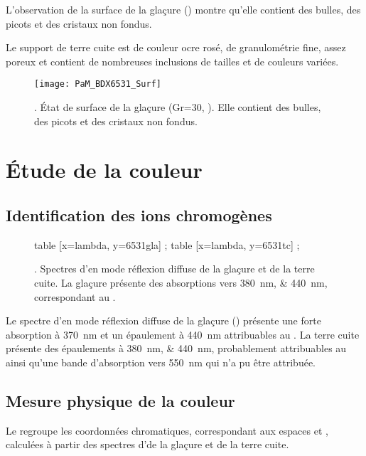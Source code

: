 L'observation de la surface de la glaçure () montre 
qu'elle contient des bulles, des picots et des cristaux non fondus.

Le support de terre cuite est de couleur ocre rosé, de granulométrie
fine, assez poreux et contient de nombreuses inclusions de tailles et
de couleurs variées.

\begin{figure}[htb]
  \texttt{[image: PaM\_BDX6531\_Surf]}
  \caption[\ -- État de surface de la glaçure]
          {\legendeD.
           État de surface de la glaçure 
           (Gr=30, ). Elle contient des bulles, 
           des picots et des cristaux non fondus.}
  \label{surf:6531}
\end{figure}


\section{Étude de la couleur}

\subsection{Identification des ions chromogènes}
\begin{figure}[htb]
  \begin{plotspectre}
       table [x=lambda, y=6531gla] {\gladata} ;
       table [x=lambda, y=6531tc] {\tcdata} ;
  \end{plotspectre}
  \caption{\legendeD.
           Spectres d'\AO en mode réflexion diffuse de la glaçure et 
           de la terre cuite. La glaçure présente des absorptions vers 
           \SIlist{380;440}{\nm}, correspondant au .}
  \label{spectre:6531}
\end{figure}

Le spectre d'\AO en mode réflexion diffuse de la glaçure 
() présente une forte absorption à \SI{370}{\nm} 
et un épaulement à \SI{440}{\nm} attribuables au . La terre 
cuite présente des épaulements à \SIlist{380;440}{\nm}, probablement 
attribuables au  ainsi qu'une bande d'absorption vers 
\SI{550}{\nm} qui n'a pu être attribuée.

\subsection{Mesure physique de la couleur}
Le  regroupe les coordonnées chromatiques, 
correspondant aux espaces \Yxy et \Lab, calculées à partir des 
spectres d'\AO de la glaçure et de la terre cuite.

